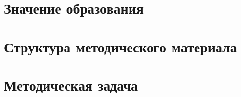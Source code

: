 

\section{Значение образования}



\section{Структура методического материала}



\section{Методическая задача}





